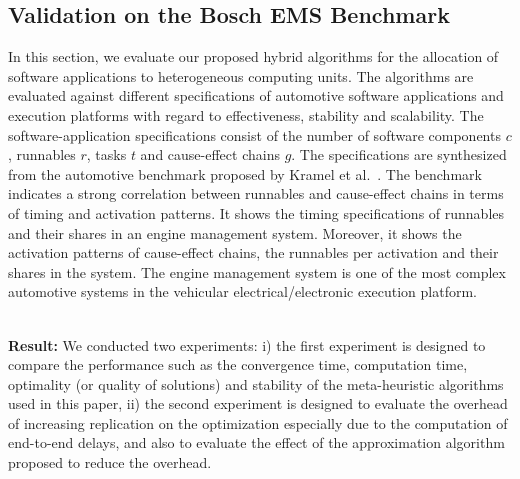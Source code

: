 \subsection{Validation on the Bosch EMS Benchmark} 
In this section, we evaluate our proposed hybrid \pso{} algorithms for the allocation of software applications to heterogeneous computing units. The algorithms are evaluated against different specifications of automotive software applications and execution platforms with regard to effectiveness, stability and scalability. The software-application specifications consist of the number of software components $c$, runnables $r$, tasks $t$ and cause-effect chains $g$.  The specifications are synthesized from the automotive benchmark proposed by Kramel et al.~\cite{Kramer2015RealFree}. The benchmark indicates a strong correlation between runnables and cause-effect chains in terms of timing and activation patterns. It shows the timing specifications of runnables and their shares in an engine management system. Moreover, it shows the activation patterns of cause-effect chains, the runnables per activation and their shares in the system. The engine management system is one of the most complex automotive systems in the vehicular electrical/electronic execution platform. 

\noindent\\ \textbf{Result:} We conducted two experiments: i) the first experiment is designed to compare the performance such as the convergence time, computation time, optimality (or quality of solutions) and stability of the meta-heuristic algorithms used in this paper, ii) the second experiment is designed to evaluate the overhead of increasing replication on the optimization especially due to the computation of end-to-end delays, and also to evaluate the effect of the approximation algorithm proposed to reduce the overhead.

